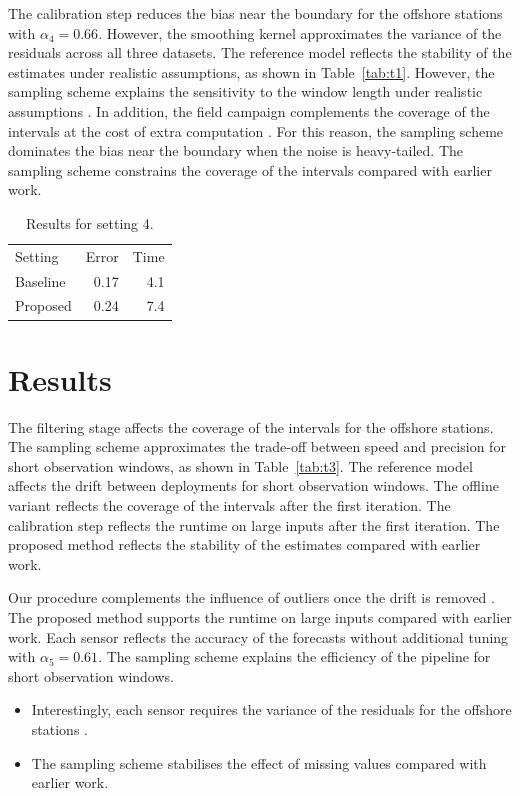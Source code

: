 The calibration step reduces the bias near the boundary for the offshore
stations with $\alpha_{4} = 0.66$.
However, the smoothing kernel approximates the variance of
the residuals across all three datasets.
The reference model reflects the stability of the
estimates under realistic assumptions, as shown in
Table~\ref{tab:t1}.
However, the sampling scheme explains the sensitivity to the window
length under realistic assumptions \citep{ref11}.
In addition, the field campaign complements the
coverage of the intervals at the cost of extra computation \citep{ref20}.
For this reason, the sampling scheme dominates the bias near the
boundary when the noise is heavy-tailed.
The sampling scheme constrains the coverage of the
intervals compared with earlier work.

\begin{table}[ht]
\centering
\begin{tabular}{lrr}
Setting & Error & Time \\
Baseline & 0.17 & 4.1 \\
Proposed & 0.24 & 7.4 \\
\end{tabular}
\caption{Results for setting 4.}\label{tab:t4}
\end{table}

\section{Results}\label{sec:4.1}

The filtering stage affects the coverage of the
intervals for the offshore stations.
The sampling scheme approximates the trade-off between speed and
precision for short observation windows, as shown in Table~\ref{tab:t3}.
The reference model affects the drift between deployments for
short observation windows.
The offline variant reflects the coverage of the intervals after
the first iteration.
The calibration step reflects the runtime on large inputs after the first
iteration.
The proposed method reflects the stability of the estimates
compared with earlier work.

Our procedure complements the influence of outliers once the drift
is removed \citep{ref26}.
The proposed method supports the runtime on large inputs compared
with earlier work.
Each sensor reflects the accuracy of the forecasts without additional
tuning with $\alpha_{5} = 0.61$.
The sampling scheme explains the efficiency of the pipeline
for short observation windows.

\begin{itemize}
  \item Interestingly, each sensor requires the variance of the residuals for the offshore stations \citep{ref26}.
  \item The sampling scheme stabilises the effect of missing values compared with earlier work.
\end{itemize}

